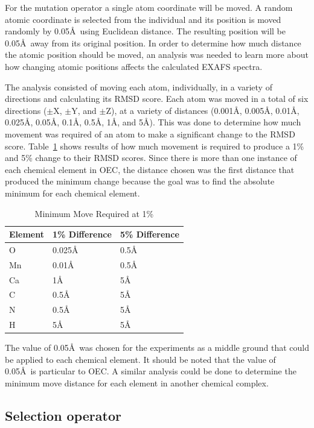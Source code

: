 \documentclass[conference]{IEEEtran}
\begin{document}
For the mutation operator a single atom coordinate will be moved. A random atomic coordinate is selected from the individual and its position is moved randomly by 0.05\AA\  using Euclidean distance. The resulting position will be 0.05\AA\ away from its original position. In order to determine how much distance the atomic position should be moved, an analysis was needed to learn more about how changing atomic positions affects the calculated EXAFS spectra.

The analysis consisted of moving each atom, individually, in a variety of directions and calculating its RMSD score. Each atom was moved in a total of six directions ($\pm$X, $\pm$Y, and $\pm$Z), at a variety of distances (0.001\AA, 0.005\AA, 0.01\AA, 0.025\AA, 0.05\AA, 0.1\AA, 0.5\AA, 1\AA, and 5\AA). This was done to determine how much movement was required of an atom to make a significant change to the RMSD score. Table~\ref{table:minMove} shows results of how much movement is required to produce a 1\% and 5\% change to their RMSD scores. Since there is more than one instance of each chemical element in OEC, the distance chosen was the first distance that produced the minimum change because the goal was to find the absolute minimum for each chemical element.

\begin{table}
\caption{Minimum Move Required at 1\%}
\label{table:minMove}
\centering
\normalsize
\begin{tabular}{ | l | l | l | }
  \hline
    Element & 1\% Difference & 5\% Difference \\ \hline
    O & 0.025\AA & 0.5\AA \\ \hline
    Mn & 0.01\AA & 0.5\AA \\ \hline
    Ca & 1\AA & 5\AA \\ \hline
    C & 0.5\AA & 5\AA \\ \hline
    N & 0.5\AA & 5\AA \\ \hline
    H & 5\AA & 5\AA \\ \hline
\end{tabular}
\end{table}

The value of 0.05\AA\ was chosen for the experiments as a middle ground that could be applied to each chemical element. It should be noted that the value of 0.05\AA\ is particular to OEC. A similar analysis could be done to determine the minimum move distance for each element in another chemical complex.

\subsection{Selection operator}
\end{document}
